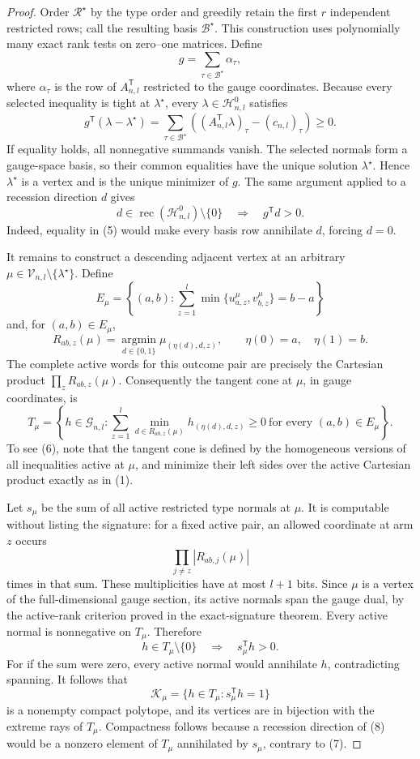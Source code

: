 \documentclass{article}
\begin{document}
\begin{proof}
Order \(\mathcal R^\star\) by the type order and greedily retain the first \(r\) independent restricted rows; call the resulting basis \(\mathcal B^\star\). This construction uses polynomially many exact rank tests on zero--one matrices. Define
\[g=\sum_{\tau\in\mathcal B^\star}\alpha_\tau,\]
where \(\alpha_\tau\) is the row of \(A_{n,l}^{\mathsf T}\) restricted to the gauge coordinates. Because every selected inequality is tight at \(\lambda^\star\), every \(\lambda\in\mathcal H^0_{n,l}\) satisfies
\[g^{\mathsf T}(\lambda-\lambda^\star)=\sum_{\tau\in\mathcal B^\star}\left((A_{n,l}^{\mathsf T}\lambda)_\tau-(c_{n,l})_\tau\right)\ge0.\tag{4}\]
If equality holds, all nonnegative summands vanish. The selected normals form a gauge-space basis, so their common equalities have the unique solution \(\lambda^\star\). Hence \(\lambda^\star\) is a vertex and is the unique minimizer of \(g\). The same argument applied to a recession direction \(d\) gives
\[d\in\operatorname{rec}(\mathcal H^0_{n,l})\setminus\{0\}\quad\Longrightarrow\quad g^{\mathsf T}d>0.\tag{5}\]
Indeed, equality in (5) would make every basis row annihilate \(d\), forcing \(d=0\).

It remains to construct a descending adjacent vertex at an arbitrary \(\mu\in\mathcal V_{n,l}\setminus\{\lambda^\star\}\). Define
\[E_\mu=\left\{(a,b):\sum_{z=1}^l\min\{u^\mu_{a,z},v^\mu_{b,z}\}=b-a\right\}\]
and, for \((a,b)\in E_\mu\),
\[R_{ab,z}(\mu)=\operatorname*{argmin}_{d\in\{0,1\}}\mu_{(\eta(d),d,z)},\qquad \eta(0)=a,\quad\eta(1)=b.\]
The complete active words for this outcome pair are precisely the Cartesian product \(\prod_zR_{ab,z}(\mu)\). Consequently the tangent cone at \(\mu\), in gauge coordinates, is
\[T_\mu=\left\{h\in\mathcal G_{n,l}:\sum_{z=1}^l\min_{d\in R_{ab,z}(\mu)}h_{(\eta(d),d,z)}\ge0\ \text{for every }(a,b)\in E_\mu\right\}.\tag{6}\]
To see (6), note that the tangent cone is defined by the homogeneous versions of all inequalities active at \(\mu\), and minimize their left sides over the active Cartesian product exactly as in (1).

Let \(s_\mu\) be the sum of all active restricted type normals at \(\mu\). It is computable without listing the signature: for a fixed active pair, an allowed coordinate at arm \(z\) occurs
\[\prod_{j\ne z}|R_{ab,j}(\mu)|\]
times in that sum. These multiplicities have at most \(l+1\) bits. Since \(\mu\) is a vertex of the full-dimensional gauge section, its active normals span the gauge dual, by the active-rank criterion proved in the exact-signature theorem. Every active normal is nonnegative on \(T_\mu\). Therefore
\[h\in T_\mu\setminus\{0\}\quad\Longrightarrow\quad s_\mu^{\mathsf T}h>0.\tag{7}\]
For if the sum were zero, every active normal would annihilate \(h\), contradicting spanning. It follows that
\[\mathcal K_\mu=\{h\in T_\mu:s_\mu^{\mathsf T}h=1\}\tag{8}\]
is a nonempty compact polytope, and its vertices are in bijection with the extreme rays of \(T_\mu\). Compactness follows because a recession direction of (8) would be a nonzero element of \(T_\mu\) annihilated by \(s_\mu\), contrary to (7).


\end{proof}
\end{document}
